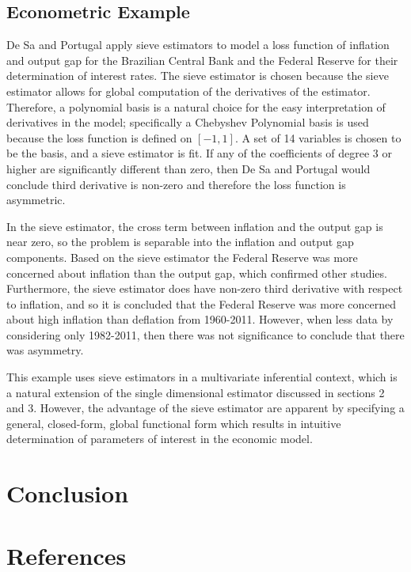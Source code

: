 \documentclass[12pt]{article}  %
\begin{document}
\subsection{Econometric Example}

De Sa and Portugal apply sieve estimators to model a loss function of inflation and output gap for the Brazilian Central Bank and the Federal Reserve for their determination of interest rates.  The sieve estimator is chosen because the sieve estimator allows for global computation of the derivatives of the estimator. Therefore, a polynomial basis is a natural choice for the easy interpretation of derivatives in the model; specifically a Chebyshev Polynomial basis is used because the loss function is defined on $[-1,1]$.  A set of 14 variables is chosen to be the basis, and a sieve estimator is fit. If any of the coefficients of degree 3 or higher are significantly different than zero, then De Sa and Portugal would conclude third derivative is non-zero and therefore the loss function is asymmetric. 

In the sieve estimator, the cross term between inflation and the output gap is near zero, so the problem is separable into the inflation and output gap components. Based on the sieve estimator the Federal Reserve was more concerned about inflation than the output gap, which confirmed other studies. Furthermore, the sieve estimator does have non-zero third derivative with respect to inflation, and so it is concluded that the Federal Reserve was more concerned about high inflation than deflation from 1960-2011. However, when less data by considering only 1982-2011, then there was not significance to conclude that there was asymmetry.  

This example uses sieve estimators in a multivariate inferential context, which is a natural extension of the single dimensional estimator discussed in sections 2 and 3. However, the advantage of the sieve estimator are apparent by specifying a general, closed-form, global functional form which results in intuitive determination of parameters of interest in the economic model. 


\section{Conclusion}

\section{References}
\nocite{*}
\printbibliography[heading=none]
\end{document}
